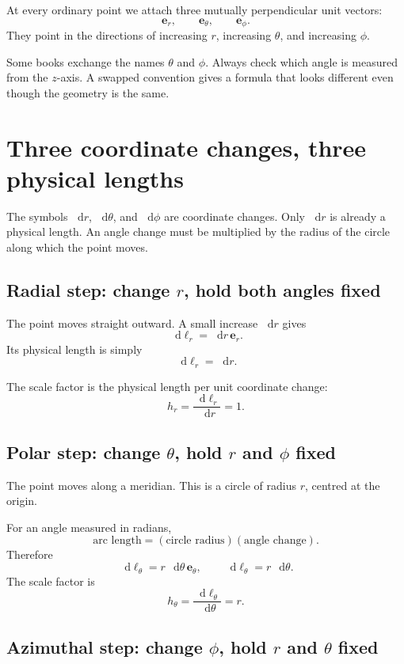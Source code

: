 \documentclass[11pt,a4paper]{article}
\newcommand{\er}{\bm e_r}
\newcommand{\etheta}{\bm e_\theta}
\newcommand{\ephi}{\bm e_\phi}
\newcommand{\dd}{\mathop{}\!\mathrm d}
\begin{document}
At every ordinary point we attach three mutually perpendicular unit vectors:
\[
  \er,\qquad\etheta,\qquad\ephi.
\]
They point in the directions of increasing \(r\), increasing \(\theta\), and increasing \(\phi\).

\begin{notecheck}
Some books exchange the names \(\theta\) and \(\phi\). Always check which angle is measured from the \(z\)-axis. A swapped convention gives a formula that looks different even though the geometry is the same.
\end{notecheck}

\clearpage

\section{Three coordinate changes, three physical lengths}

The symbols \(\dd r\), \(\dd\theta\), and \(\dd\phi\) are coordinate changes. Only \(\dd r\) is already a physical length. An angle change must be multiplied by the radius of the circle along which the point moves.

\subsection{Radial step: change \(r\), hold both angles fixed}

The point moves straight outward. A small increase \(\dd r\) gives
\[
  \dd\bm\ell_r=\dd r\,\er.
\]
Its physical length is simply
\[
  \boxed{\dd\ell_r=\dd r}.
\]

The scale factor is the physical length per unit coordinate change:
\[
  h_r=\frac{\dd\ell_r}{\dd r}=1.
\]

\subsection{Polar step: change \(\theta\), hold \(r\) and \(\phi\) fixed}

The point moves along a meridian. This is a circle of radius \(r\), centred at the origin.

For an angle measured in radians,
\[
  \text{arc length}
  =(\text{circle radius})(\text{angle change}).
\]
Therefore
\[
  \dd\bm\ell_\theta=r\,\dd\theta\,\etheta,
  \qquad
  \boxed{\dd\ell_\theta=r\,\dd\theta}.
\]
The scale factor is
\[
  h_\theta=\frac{\dd\ell_\theta}{\dd\theta}=r.
\]

\subsection{Azimuthal step: change \(\phi\), hold \(r\) and \(\theta\) fixed}
\end{document}
